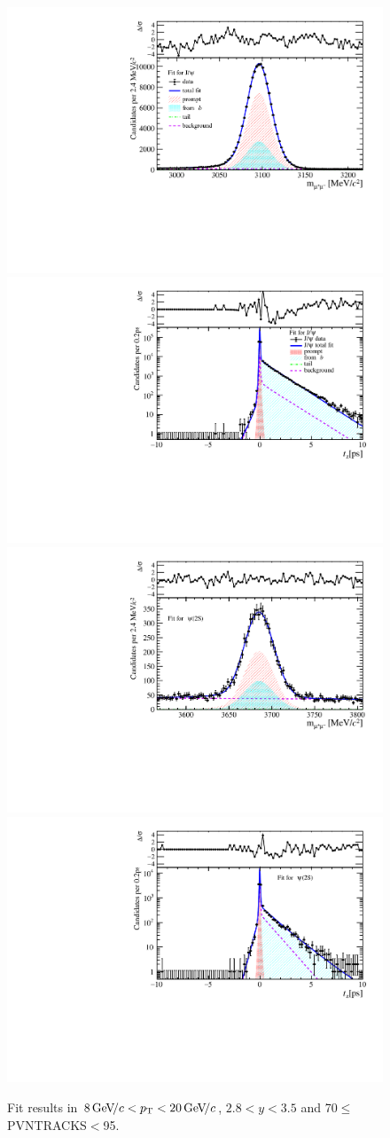 \begin{figure}[H]
\begin{center}
\includegraphics[width=0.47\linewidth]{pdf/Jpsi/drawmass/n4y2pt5.pdf}
\includegraphics[width=0.47\linewidth]{pdf/Jpsi/2DFit/n4y2pt5.pdf}
\vspace*{-0.5cm}
\includegraphics[width=0.47\linewidth]{pdf/Psi2S/drawmass/n4y2pt5.pdf}
\includegraphics[width=0.47\linewidth]{pdf/Psi2S/2DFit/n4y2pt5.pdf}
\vspace*{-0.5cm}
\end{center}
\caption{Fit results in $8\text{\,Ge\kern -0.1em V\!/}c<p_{\mathrm{T}}<20\text{\,Ge\kern -0.1em V\!/}c$, $2.8<y<3.5$ and 70$\leq$PVNTRACKS$<$95.}
\label{Fitn4y2pt5}
\end{figure}
